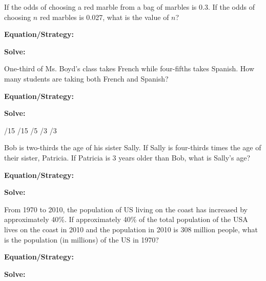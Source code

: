 \vfill
\newpage
\begin{multicols*}{2}
\begin{outline}[enumerate]
\medium

\1 If the odds of choosing a red marble from a bag of marbles is 0.3. If the odds of choosing $n$ red marbles is 0.027, what is the value of $n$?

\bigskip
\textbf{Equation/Strategy:} \hrulefill

\bigskip
\textbf{Solve:}

\vfill
{}

\midline

\1 One-third of Ms. Boyd's class takes French while four-fifths takes Spanish. How many students are taking both French and Spanish?

\bigskip
\textbf{Equation/Strategy:} \hrulefill

\bigskip
\textbf{Solve:}

\vfill
{}/15
/15
/5
/3
/3

\columnbreak
\advanced

\1 Bob is two-thirds the age of his sister Sally. If Sally is four-thirds times the age of their sister, Patricia. If Patricia is 3 years older than Bob, what is Sally's age?

\bigskip
\textbf{Equation/Strategy:} \hrulefill

\bigskip
\textbf{Solve:}

\vfill
{}

\midline

\1 From 1970 to 2010, the population of US living on the coast has increased by approximately 40\%. If approximately 40\% of the total population of the USA lives on the coast in 2010 and the population in 2010 is 308 million people, what is the population (in millions) of the US in 1970?

\bigskip
\textbf{Equation/Strategy:} \hrulefill

\bigskip
\textbf{Solve:}

\vfill
{}
\end{outline}
\end{multicols*}